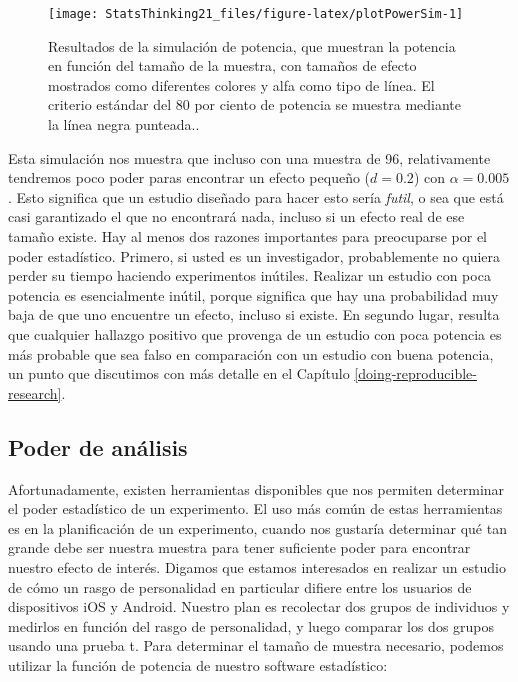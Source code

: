 \documentclass[
  12pt,
]{book}
\theoremstyle{definition}
\theoremstyle{definition}
\theoremstyle{definition}
\theoremstyle{remark}
\begin{document}
\begin{figure}
\texttt{[image: StatsThinking21\_files/figure-latex/plotPowerSim-1]} \caption{Resultados de la simulación de potencia, que muestran la potencia en función del tamaño de la muestra, con tamaños de efecto mostrados como diferentes colores y alfa como tipo de línea. El criterio estándar del 80 por ciento de potencia se muestra mediante la línea negra punteada..}\label{fig:plotPowerSim}
\end{figure}

Esta simulación nos muestra que incluso con una muestra de 96, relativamente tendremos poco poder paras encontrar un efecto pequeño (\(d = 0.2\)) con \(\alpha = 0.005\). Esto significa que un estudio diseñado para hacer esto sería \emph{futil}, o sea que está casi garantizado el que no encontrará nada, incluso si un efecto real de ese tamaño existe.
Hay al menos dos razones importantes para preocuparse por el poder estadístico. Primero, si usted es un investigador, probablemente no quiera perder su tiempo haciendo experimentos inútiles. Realizar un estudio con poca potencia es esencialmente inútil, porque significa que hay una probabilidad muy baja de que uno encuentre un efecto, incluso si existe. En segundo lugar, resulta que cualquier hallazgo positivo que provenga de un estudio con poca potencia es más probable que sea falso en comparación con un estudio con buena potencia, un punto que discutimos con más detalle en el Capítulo \ref{doing-reproducible-research}.

\hypertarget{poder-de-anuxe1lisis}{%
\subsection{Poder de análisis}\label{poder-de-anuxe1lisis}}

Afortunadamente, existen herramientas disponibles que nos permiten determinar el poder estadístico de un experimento. El uso más común de estas herramientas es en la planificación de un experimento, cuando nos gustaría determinar qué tan grande debe ser nuestra muestra para tener suficiente poder para encontrar nuestro efecto de interés.
Digamos que estamos interesados en realizar un estudio de cómo un rasgo de personalidad en particular difiere entre los usuarios de dispositivos iOS y Android. Nuestro plan es recolectar dos grupos de individuos y medirlos en función del rasgo de personalidad, y luego comparar los dos grupos usando una prueba t. Para determinar el tamaño de muestra necesario, podemos utilizar la función de potencia de nuestro software estadístico:
\end{document}

